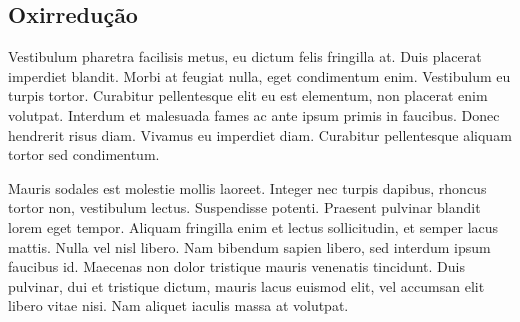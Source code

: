 \documentclass[12pt]{article}
\begin{document}
\begin{multicols*}{2}
        \subsection{Oxirredução}
        Vestibulum pharetra facilisis metus, eu dictum felis fringilla at. Duis placerat imperdiet blandit. Morbi 
        at feugiat nulla, eget condimentum enim. Vestibulum eu turpis tortor. Curabitur pellentesque elit eu est 
        elementum, non placerat enim volutpat. Interdum et malesuada fames ac ante ipsum primis in faucibus. 
        Donec hendrerit risus diam. Vivamus eu imperdiet diam. Curabitur pellentesque aliquam tortor sed condimentum.

        Mauris sodales est molestie mollis laoreet. Integer nec turpis dapibus, rhoncus tortor non, vestibulum 
        lectus. Suspendisse potenti. Praesent pulvinar blandit lorem eget tempor. Aliquam fringilla enim et lectus 
        sollicitudin, et semper lacus mattis. Nulla vel nisl libero. Nam bibendum sapien libero, sed interdum ipsum 
        faucibus id. Maecenas non dolor tristique mauris venenatis tincidunt. Duis pulvinar, dui et tristique dictum, 
        mauris lacus euismod elit, vel accumsan elit libero vitae nisi. Nam aliquet iaculis massa at volutpat.
        
        
    \end{multicols*}
    
\end{document}
